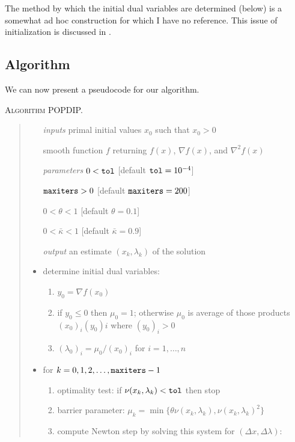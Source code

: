 \documentclass[11pt]{article}
\newcommand{\grad}{\nabla}
\begin{document}
The method by which the initial dual variables are determined (below) is a somewhat ad hoc construction for which I have no reference.  This issue of initialization is discussed in \cite{Gertzetal2004}.


\subsection*{Algorithm}

We can now present a pseudocode for our algorithm.

\bigskip
\noindent \textsc{Algorithm POPDIP.}
\begin{quote}
\begin{itemize}
\item[\emph{inputs}]  primal initial values $x_0$ such that $x_0 > 0$
\item[]  smooth function $f$ returning $f(x)$, $\grad f(x)$, and $\grad^2 f(x)$
\item[\emph{parameters}]  $0<\text{\texttt{tol}}$ [default $\text{\texttt{tol}}=10^{-4}$]
\item[]  $\text{\texttt{maxiters}}>0$ [default $\text{\texttt{maxiters}}=200$]
\item[]  $0<\theta<1$ [default $\theta=0.1$]
\item[]  $0<\bar\kappa<1$ [default $\bar\kappa=0.9$]
\item[\emph{output}]  an estimate $(x_k,\lambda_k)$ of the solution
\item  determine initial dual variables:
    \renewcommand{\labelenumi}{(\roman{enumi})}
    \begin{enumerate}
    \item $y_0 = \grad f(x_0)$
    \item if $y_0 \le 0$ then $\mu_0=1$; otherwise $\mu_0$ is average of those products $(x_0)_i (y_0)i$ where $(y_0)_i > 0$
    \item $(\lambda_0)_i = \mu_0 / (x_0)_i$ for $i=1,\dots,n$
    \end{enumerate}
\item  for $k=0,1,2,\dots,\text{\texttt{maxiters}}-1$
    \renewcommand{\labelenumi}{(\roman{enumi})}
    \begin{enumerate}
    \item optimality test: if $\nu(x_k,\lambda_k)<\text{\texttt{tol}}$ then stop
    \item barrier parameter: $\mu_k = \min\{\theta \nu(x_k,\lambda_k),\nu(x_k,\lambda_k)^2\}$
    \item compute Newton step by solving this system for $(\Delta x,\Delta \lambda)$:

\end{enumerate}
\end{itemize}
\end{quote}
\end{document}
